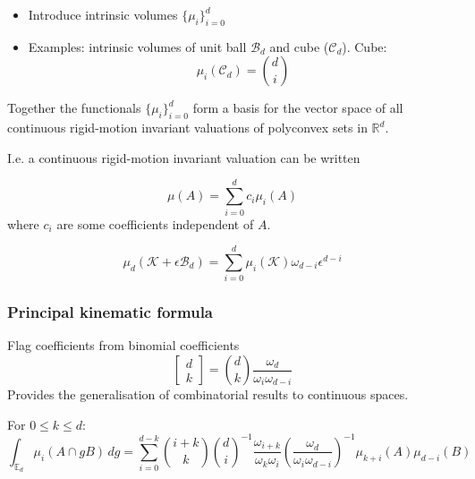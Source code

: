 \begin{itemize}
\item Introduce intrinsic volumes $\{\mu_i\}_{i=0}^d$
\item Examples: intrinsic volumes of unit ball $\mathcal{B}_d$ and cube ($\mathcal{C}_d$). Cube:
  \begin{equation}
    \mu_i (\mathcal{C}_d) = {d \choose i}
  \end{equation}
\end{itemize}

\begin{theorem}
  Together the functionals $\{\mu_i\}_{i=0}^d$ form a basis for the vector space of all continuous rigid-motion invariant valuations of polyconvex sets in $\mathbb{R}^d$.
\end{theorem}

I.e. a continuous rigid-motion invariant valuation can be written

\begin{equation}
  \mu(A) = \sum_{i=0}^d c_i \mu_i(A)
\end{equation}
where $c_i$ are some coefficients independent of $A$.

\begin{theorem}
  \begin{equation}
    \mu_d(\mathcal{K} + \epsilon \mathcal{B}_d) =
    \sum_{i=0}^d \mu_i(\mathcal{K}) \omega_{d-i} \epsilon^{d-i}
  \end{equation}
\end{theorem}

\subsubsection{Principal kinematic formula}

Flag coefficients from binomial coefficients
\begin{equation}
  \begin{bmatrix} d \\ k \end{bmatrix}
  = {d \choose k}
  \frac{\omega_d}{\omega_i \omega_{d-i}}
\end{equation}
Provides the generalisation of combinatorial results to continuous spaces.

\begin{theorem}
  For $0 \le k \le d$:
  \begin{equation}
    \int_{\mathbb{E}_d} \mu_i (A \cap g B) \, dg =
    \sum_{i=0}^{d-k} {i + k \choose k} {d \choose i}^{-1} \frac{\omega_{i+k}}{\omega_k \omega_i} \left(\frac{\omega_d}{\omega_i \omega_{d-i}} \right)^{-1} \mu_{k+i}(A) \mu_{d-i}(B)
  \end{equation}
\end{theorem}
